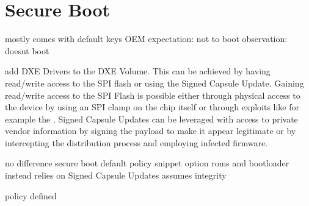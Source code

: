 
\section{Secure Boot}
mostly comes with default keys OEM
expectation:
not to boot
observation:
doesnt boot

add DXE Drivers to the DXE Volume.
This can be achieved by having read/write access to the SPI flash or using the Signed Capsule Update. Gaining read/write access to the SPI Flash is possible either through physical access to the device by using an SPI clamp on the chip itself or through exploits like for example the
. Signed Capsule Updates can be leveraged with access to private vendor information by signing the payload to make it appear legitimate or by intercepting the distribution process and employing infected firmware.

no difference
secure boot default policy snippet
option roms and bootloader
instead relies on Signed Capsule Updates
assumes integrity

\cite[32.3]{uefi-spec}

policy defined
\cite[32.5.3.3 Authorization Process]{uefi-spec}
